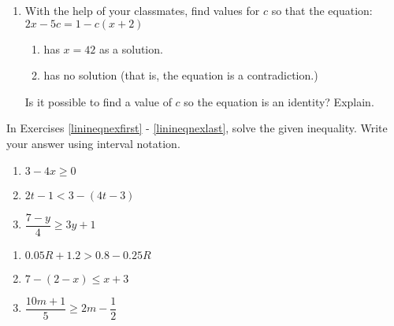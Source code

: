\documentclass[11pt]{article}
\theoremstyle{definition}  %
\newcounter{HW}
\begin{document}
\begin{enumerate}
\setcounter{enumi}{\value{HW}}

\item With the help of your classmates, find values for $c$ so that the equation:  $2x - 5c = 1 - c(x+2)$

\begin{enumerate}

\item  has $x = 42$ as a solution.
\item  has no solution (that is, the equation is a contradiction.)

\end{enumerate}
Is it possible to find a value of $c$ so the equation is an identity?  Explain.

\setcounter{HW}{\value{enumi}}
\end{enumerate}

\newpage


In Exercises \ref{linineqnexfirst} - \ref{linineqnexlast}, solve the given inequality.  Write your answer using interval notation.

\begin{multicols}{3}
\begin{enumerate}
\setcounter{enumi}{\value{HW}}
\item $3 - 4x \geq 0$\label{linineqnexfirst}
\item  $2t - 1 < 3 - (4t-3)$
\item  $\dfrac{7 -y}{4} \geq 3y + 1$ 

\setcounter{HW}{\value{enumi}}
\end{enumerate}
\end{multicols}

\begin{multicols}{3}
\begin{enumerate}
\setcounter{enumi}{\value{HW}}

\item $0.05R + 1.2 > 0.8 - 0.25R$
\item $7 - (2-x) \leq x+3$
\item $\dfrac{10m+1}{5} \geq 2m - \dfrac{1}{2}$ 

\setcounter{HW}{\value{enumi}}
\end{enumerate}
\end{multicols}
\end{document}
